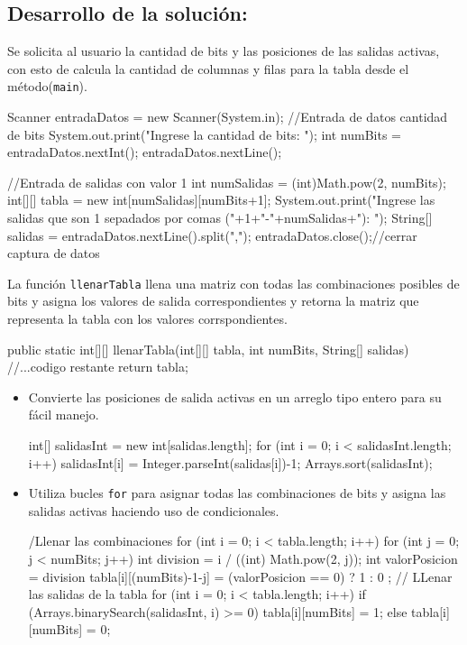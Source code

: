\subsection{\textbf{Desarrollo de la solución:}}

Se solicita al usuario la cantidad de bits y las posiciones de las salidas activas, con esto de calcula la cantidad de columnas y filas para la tabla desde el método(\texttt{main}).
\begin{javaCode}
Scanner entradaDatos = new Scanner(System.in);
    //Entrada de datos cantidad de bits 
    System.out.print("Ingrese la cantidad de bits: ");
    int numBits = entradaDatos.nextInt();
    entradaDatos.nextLine();
    
    //Entrada de salidas con valor 1
    int numSalidas = (int)Math.pow(2, numBits);
    int[][] tabla = new int[numSalidas][numBits+1];
    System.out.print("Ingrese las salidas que son 1 sepadados por comas ("+1+"-"+numSalidas+"): ");
    String[] salidas = entradaDatos.nextLine().split(",");
    entradaDatos.close();//cerrar captura de datos
\end{javaCode}

La función \texttt{llenarTabla} llena una matriz con todas las combinaciones posibles de bits y asigna los valores de salida correspondientes y retorna la matriz que representa la tabla con los valores corrspondientes.
\begin{javaCode}
    public static int[][] llenarTabla(int[][] tabla, int numBits, String[] salidas) {
    //...codigo restante
    return tabla;
    }
\end{javaCode}
   \begin{itemize}
       \item[{\ieeeguilsinglright}] {\it } Convierte las posiciones de salida activas en un arreglo tipo entero para su fácil manejo.
   \begin{javaCode}
    int[] salidasInt = new int[salidas.length];
    for (int i = 0; i < salidasInt.length; i++) {
        salidasInt[i] = Integer.parseInt(salidas[i])-1;
    }
    Arrays.sort(salidasInt);
   \end{javaCode}
       
       \item[{\ieeeguilsinglright}] {\it }  Utiliza bucles \texttt{for} para asignar todas las combinaciones de bits y asigna las salidas activas haciendo uso de condicionales.
    \begin{javaCode}
    /Llenar las combinaciones
    for (int i = 0; i < tabla.length; i++) {
        for (int j = 0; j < numBits; j++) {
            int division = i / ((int) Math.pow(2, j));
            int valorPosicion = division %
            tabla[i][(numBits)-1-j] = (valorPosicion == 0)   ?   1 : 0 ;
        }
    }
    // LLenar las salidas de la tabla
    for (int i = 0; i < tabla.length; i++) {
        if (Arrays.binarySearch(salidasInt, i) >= 0) {
            tabla[i][numBits] = 1;
        } else {
            tabla[i][numBits] = 0;
        }
    }
    \end{javaCode}

   \end{itemize}


